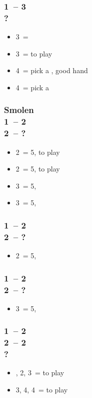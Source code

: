 \documentclass[12pt, a4paper]{article}
\begin{document}
\subsubsection*{1\ntx\ -- 3\hearts \\ ?}
\begin{itemize}
    \item 3\spades\ = \nat
    \item 3\nt\ = to play
    \item 4\hearts\ = pick a \minor, good hand
    \item 4\nt\ = pick a \minor
\end{itemize}

\subsubsection*{Smolen \\
                1\ntx\ -- 2\clubs \\
                2\diams\ -- ?}
\begin{itemize}
    \item 2\hearts\ = 5\spades, to play
    \item 2\spades\ = 5\hearts, to play
    \item 3\hearts\ = 5\hearts, \gf
    \item 3\spades\ = 5\spades, \gf
\end{itemize}

\subsubsection*{1\ntx\ -- 2\diams \\
                2\hearts\ -- ?}
\begin{itemize}
    \item 2\spades\ = 5\spades, \inv
\end{itemize}

\subsubsection*{1\ntx\ -- 2\hearts \\
                2\spades\ -- ?}
\begin{itemize}
    \item 3\hearts\ = 5\hearts, \inv
\end{itemize}

\subsubsection*{1\ntx\ -- 2\diams \\
                2\hearts\ -- 2\spades \\
                ?}
\begin{itemize}
    \item \pass, 2\nt, 3\hearts\ = to play
    \item 3\nt, 4\hearts, 4\spades\ = to play
\end{itemize}
\end{document}
